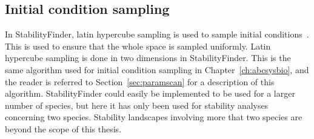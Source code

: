 \subsection{Initial condition sampling}
\label{sec:init_cond_samp}
In StabilityFinder, latin hypercube sampling is used to sample initial conditions~\autocite{MCKAY:2000vt}. This is used to ensure that the whole space is sampled uniformly. Latin hypercube sampling is done in two dimensions in StabilityFinder. This is the same algorithm used for initial condition sampling in Chapter~\ref{ch:abcsysbio}, and the reader is referred to Section~\ref{sec:paramscan} for a description of this algorithm. StabilityFinder could easily be implemented to be used for a larger number of species, but here it has only been used for stability analyses concerning two species. Stability landscapes involving more that two species are beyond the scope of this thesis. %



\clearpage

%
 
